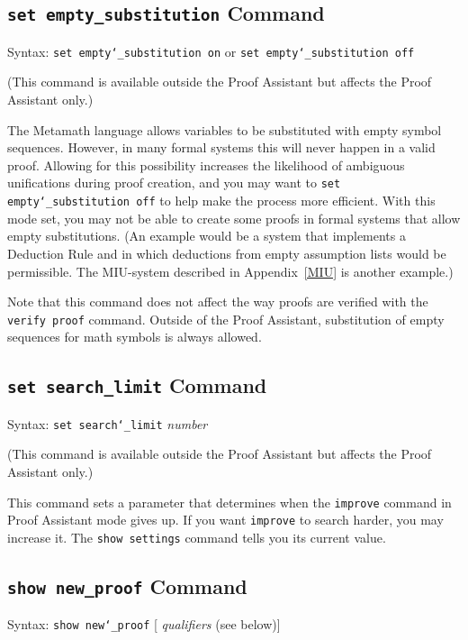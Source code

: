 \subsection{\texttt{set empty\_substitution} Command}
Syntax:  \texttt{set empty{\char`\_}substitution on} or \texttt{set
empty{\char`\_}substitution off}

(This command is available outside the Proof Assistant but affects the
Proof Assistant only.)

The Metamath language allows variables to be
substituted
with empty symbol sequences.  However, in many
formal systems this will never happen in a valid
proof.  Allowing for this possibility increases the likelihood of
ambiguous unifications during proof creation, and you
may want to \texttt{set empty{\char`\_}substitution off} to help make
the process more efficient.  With this mode set, you may not be able to
create some proofs in formal systems that allow empty substitutions.
(An example would be a system that implements a Deduction Rule and in
which deductions from empty assumption lists would be permissible.  The
MIU-system described in Appendix~\ref{MIU} is another
example.)

Note that this command does not affect the way proofs are verified with
the \texttt{verify proof} command.  Outside of the Proof Assistant,
substitution of empty sequences for math symbols is always allowed.



\subsection{\texttt{set search\_limit} Command} Syntax:  \texttt{set search{\char`\_}limit} {\em
number}

(This command is available outside the Proof Assistant but affects the
Proof Assistant only.)

This command sets a parameter that determines when the \texttt{improve} command
in Proof Assistant mode gives up.  If you want \texttt{improve} to search harder,
you may increase it.  The \texttt{show settings} command tells you its current
value.


\subsection{\texttt{show new\_proof} Command}
Syntax:  \texttt{show new{\char`\_}proof} [{\em
qualifiers} (see below)]

